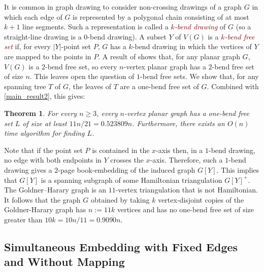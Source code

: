 \documentclass[11pt]{article}
\newcommand{\pat}[1]{\textcolor{red}{PM: #1}}
\newtheorem{thm}{Theorem}
\newcommand{\defin}[1]{\emph{\textcolor{Maroon}{#1}}}
\theoremstyle{definition}
\newcommand{\vida}[1]{[{\color{pink}VD: #1}]}
\begin{document}
It is common in graph drawing to consider non-crossing drawings of a graph $G$ in which each edge of $G$ is represented by a polygonal chain consisting of at most $k+1$ line segments.  Such a representation is called a \defin{$k$-bend drawing} of $G$ (so a straight-line drawing is a $0$-bend drawing). A subset $Y$ of $V(G)$ is a \defin{$k$-bend free set} if, for every $|Y|$-point set $P$,  $G$ has a $k$-bend drawing in which the vertices of $Y$ are mapped to the points in $P$. A result of \citet{DBLP:journals/combinatorica/FraysseixPP90} shows that, for any planar graph $G$, $V(G)$ is a $2$-bend free set, so every $n$-vertex planar graph has a $2$-bend free set of size $n$. This leaves open the question of $1$-bend free sets.  We show that, for any spanning tree $T$ of $G$, the leaves of $T$ are a one-bend free set of $G$.  Combined with \cref{main_result2}, this gives:

\begin{thm}\label{one_bend_collinear_thm}
  For every $n\ge 3$, every $n$-vertex planar graph has a one-bend free set $L$ of size at least $11n/21=0.\overline{523809}n$.  Furthermore, there exists an $O(n)$ time algorithm for finding $L$.
\end{thm}

Note that if the point set $P$ is contained in the $x$-axis then, in a $1$-bend drawing, no edge with both endpoints in $Y$ crosses the $x$-axis.  Therefore, such a $1$-bend drawing gives a $2$-page book-embedding of the induced graph $G[Y]$. This implies that $G[Y]$ is a spanning subgraph of some Hamiltonian triangulation $G[Y]^+$.  The Goldner–Harary graph is an $11$-vertex triangulation that is not Hamiltonian. It follows that the graph $G$ obtained by taking $k$ vertex-disjoint copies of the Goldner-Harary graph has $n:=11k$ vertices and has no one-bend free set of size greater than $10k=10n/11=0.90\overline{90}n$.

\subsection{Simultaneous Embedding with Fixed Edges and Without Mapping}


\end{document}
